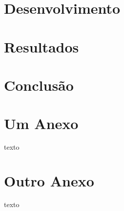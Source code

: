 \documentclass[tcc,capa]{texufpel}
\begin{document}

\chapter{Desenvolvimento}


\chapter{Resultados}


\chapter{Conclusão}




 

%

\annex
\chapter{Um Anexo}

texto

\chapter{Outro Anexo}

texto
\end{document}
